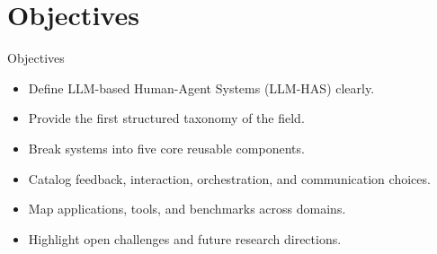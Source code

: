 \documentclass[10pt]{beamer}
\begin{document}
\section{Objectives}
\begin{frame}{Objectives}
\begin{itemize}
  \item Define LLM-based Human-Agent Systems (LLM-HAS) clearly.
  \item Provide the first structured taxonomy of the field.
  \item Break systems into five core reusable components.
  \item Catalog feedback, interaction, orchestration, and communication choices.
  \item Map applications, tools, and benchmarks across domains.
  \item Highlight open challenges and future research directions.
\end{itemize}
\end{frame}
\end{document}
